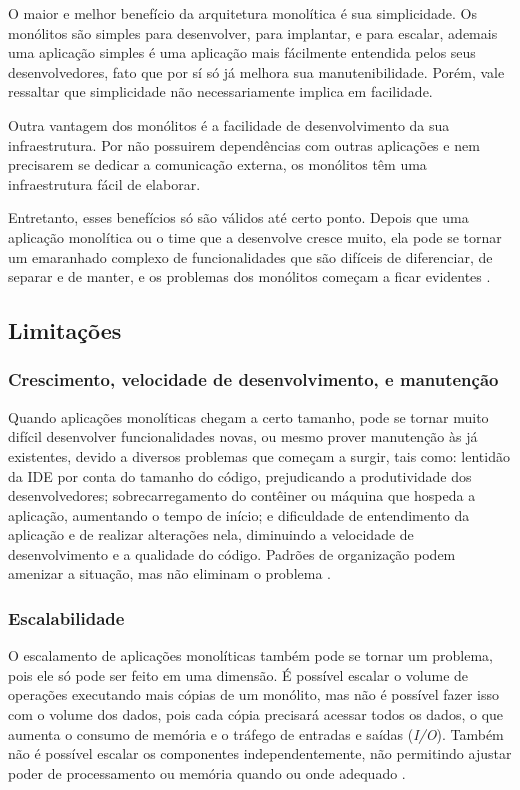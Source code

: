 O maior e melhor benefício da arquitetura monolítica é sua simplicidade. Os monólitos são simples para desenvolver, para implantar, e para escalar, ademais uma aplicação simples é uma aplicação mais fácilmente entendida pelos seus desenvolvedores, fato que por sí só já melhora sua manutenibilidade. Porém, vale ressaltar que simplicidade não necessariamente implica em facilidade.

Outra vantagem dos monólitos é a facilidade de desenvolvimento da sua infraestrutura. Por não possuirem dependências com outras aplicações e nem precisarem se dedicar a comunicação externa, os monólitos têm uma infraestrutura fácil de elaborar.

Entretanto, esses benefícios só são válidos até certo ponto. Depois que uma aplicação monolítica ou o time que a desenvolve cresce muito, ela pode se tornar um emaranhado complexo de funcionalidades que são difíceis de diferenciar, de separar e de manter, e os problemas dos monólitos começam a ficar evidentes \cite{microservicesIO_monolithic_architecture}.

\subsection{Limitações}\label{subsection-monolitos-limitacoes}

\subsubsection{Crescimento, velocidade de desenvolvimento, e manutenção}
Quando aplicações monolíticas chegam a certo tamanho, pode se tornar muito difícil desenvolver funcionalidades novas, ou mesmo prover manutenção às já existentes, devido a diversos problemas que começam a surgir, tais como: lentidão da IDE por conta do tamanho do código, prejudicando a produtividade dos desenvolvedores; sobrecarregamento do contêiner ou máquina que hospeda a aplicação, aumentando o tempo de início; e dificuldade de entendimento da aplicação e de realizar alterações nela, diminuindo a velocidade de desenvolvimento e a qualidade do código. Padrões de organização podem amenizar a situação, mas não eliminam o problema \cite{microservicesIO_monolithic_architecture}.

\subsubsection{Escalabilidade}
O escalamento de aplicações monolíticas também pode se tornar um problema, pois ele só pode ser feito em uma dimensão. É possível escalar o volume de operações executando mais cópias de um monólito, mas não é possível fazer isso com o volume dos dados, pois cada cópia precisará acessar todos os dados, o que aumenta o consumo de memória e o tráfego de entradas e saídas (\emph{I/O}). Também não é possível escalar os componentes independentemente, não permitindo ajustar poder de processamento ou memória quando ou onde adequado \cite{microservicesIO_monolithic_architecture}.

